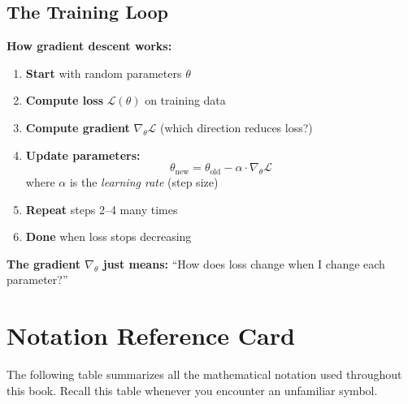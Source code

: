 \begin{chapterenv}
\subsection{The Training Loop}

\begin{infobox}
\textbf{How gradient descent works:}

\begin{enumerate}[nosep]
    \item \textbf{Start} with random parameters $\theta$
    \item \textbf{Compute loss} $\mathcal{L}(\theta)$ on training data
    \item \textbf{Compute gradient} $\nabla_\theta \mathcal{L}$ (which direction reduces loss?)
    \item \textbf{Update parameters:}
    \[\theta_{\text{new}} = \theta_{\text{old}} - \alpha \cdot \nabla_\theta \mathcal{L}\]
    where $\alpha$ is the \textit{learning rate} (step size)
    \item \textbf{Repeat} steps 2--4 many times
    \item \textbf{Done} when loss stops decreasing
\end{enumerate}

\textbf{The gradient $\nabla_\theta$ just means:} ``How does loss change when I change each parameter?''
\end{infobox}

\section{Notation Reference Card}

The following table summarizes all the mathematical notation used throughout this book. Recall this table whenever you encounter an unfamiliar symbol.


\end{chapterenv}
